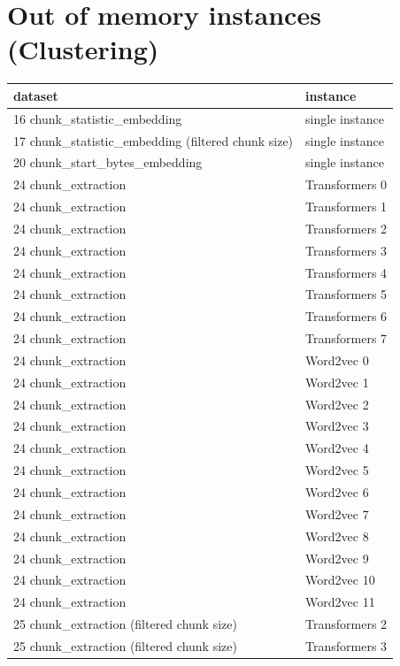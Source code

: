 \section{Out of memory instances (Clustering)}

\label{sec:annexe:out_of_memory_instances_clustering}

\begin{table}[H]
\centering
\begin{tabular}{ll}
\hline
dataset & instance \\ 
\hline
16 chunk\_statistic\_embedding & single instance \\ 
17 chunk\_statistic\_embedding (filtered chunk size) & single instance \\ 
20 chunk\_start\_bytes\_embedding & single instance \\ 
24 chunk\_extraction & Transformers 0 \\ 
24 chunk\_extraction & Transformers 1 \\ 
24 chunk\_extraction & Transformers 2 \\ 
24 chunk\_extraction & Transformers 3 \\ 
24 chunk\_extraction & Transformers 4 \\ 
24 chunk\_extraction & Transformers 5 \\ 
24 chunk\_extraction & Transformers 6 \\ 
24 chunk\_extraction & Transformers 7 \\ 
24 chunk\_extraction & Word2vec 0 \\ 
24 chunk\_extraction & Word2vec 1 \\ 
24 chunk\_extraction & Word2vec 2 \\ 
24 chunk\_extraction & Word2vec 3 \\ 
24 chunk\_extraction & Word2vec 4 \\ 
24 chunk\_extraction & Word2vec 5 \\ 
24 chunk\_extraction & Word2vec 6 \\ 
24 chunk\_extraction & Word2vec 7 \\ 
24 chunk\_extraction & Word2vec 8 \\ 
24 chunk\_extraction & Word2vec 9 \\ 
24 chunk\_extraction & Word2vec 10 \\ 
24 chunk\_extraction & Word2vec 11 \\ 
25 chunk\_extraction (filtered chunk size) & Transformers 2 \\ 
25 chunk\_extraction (filtered chunk size) & Transformers 3 \\ 

\end{tabular}
\end{table}
